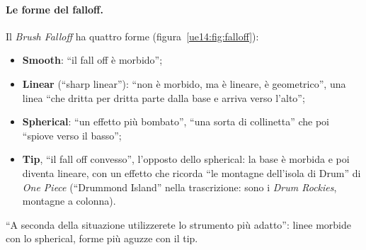 \paragraph{Le forme del falloff.} Il \emph{Brush Falloff} ha quattro forme
(figura~\ref{ue14:fig:falloff}):
\begin{itemize}
  \item \textbf{Smooth}: ``il fall off è morbido'';
  \item \textbf{Linear} (``sharp linear''): ``non è morbido, ma è lineare, è geometrico'', una
        linea ``che dritta per dritta parte dalla base e arriva verso l'alto'';
  \item \textbf{Spherical}: ``un effetto più bombato'', ``una sorta di collinetta'' che poi
        ``spiove verso il basso'';
  \item \textbf{Tip}, ``il fall off convesso'', l'opposto dello spherical: la base è morbida e
        poi diventa lineare, con un effetto che ricorda ``le montagne dell'isola di Drum'' di
        \emph{One Piece} (``Drummond Island'' nella trascrizione: sono i \emph{Drum
        Rockies}, montagne a colonna).
\end{itemize}
``A seconda della situazione utilizzerete lo strumento più adatto'': linee morbide con lo
spherical, forme più aguzze con il tip.

